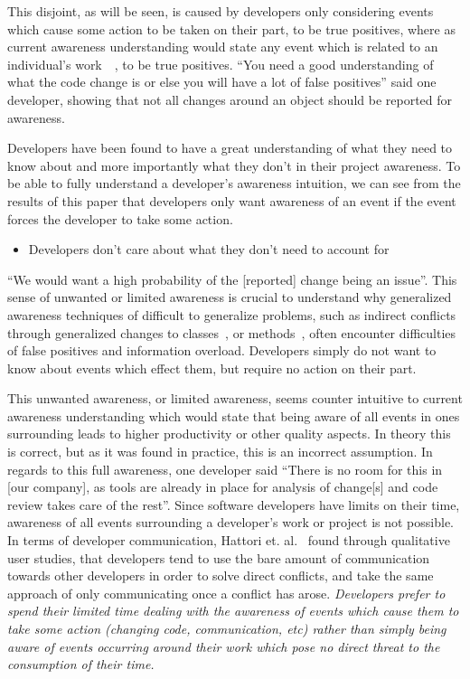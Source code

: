 \documentclass[conference]{IEEEtran}
\begin{document}
This disjoint, as will
be seen, is caused by developers only considering events which cause some action to be taken on their part, to be true positives,
where as current awareness understanding would state any event which is related to an individual's
work~\cite{Herbsleb06collaborationin}~\cite{Cataldo:2008:SCF}, to be true positives.
``You need a good understanding of what the code change is or else you will have a lot of false positives'' said one developer,
showing that not all changes around an object should be reported for awareness.

Developers have been found to have a great understanding of what they need to know about and more importantly what they don't in
their project awareness. To be able to fully understand a developer's awareness intuition, we can see from the results of this paper that
developers only want awareness of an event if the event forces the developer to take some action. 

\begin{itemize}
	\item Developers don't care about what they don't need to account for
\end{itemize}

``We would want a high probability of the [reported] change being an issue''.
This sense of unwanted or limited awareness is crucial to understand why generalized
awareness techniques of difficult to generalize problems, such as indirect conflicts through generalized changes to
classes~\cite{Sarma:2007:TSA}, or methods~\cite{Trainer:2005:BGT,Servant:2010:CPI}, often encounter difficulties of false
positives and information overload.
Developers simply do not want to know about events which effect them, but require no action on their part.

This unwanted awareness, or limited awareness, seems counter intuitive to current awareness understanding which would state that
being aware of all events in ones surrounding leads to higher productivity or other quality aspects. In theory this is correct,
but as it was found in practice, this is an incorrect assumption.
In regards to this full awareness, one developer said ``There is no room for this in [our company], as tools are already in place for
analysis of change[s] and code review takes care of the rest''. Since software developers have limits on their time, awareness of
all events surrounding a developer's work or project is not possible.
In terms of developer communication, Hattori et. al.~\cite{Hattori:2012:ICG} found through qualitative user studies, that developers
tend to use the bare amount of communication
towards other developers in order to solve direct conflicts, and take the same approach of only communicating once a conflict has arose.
\textit{Developers prefer to spend their limited time dealing with
the awareness of events which cause them to take some action (changing code, communication, etc) rather than simply being aware
of events occurring around their work which pose no direct threat to the consumption of their time.}
\end{document}
